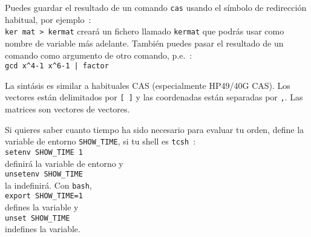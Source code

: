 \documentclass{article}
\begin{document}
Puedes guardar el resultado de un comando {\tt cas} usando el s\'imbolo de redirecci\'on habitual, por ejemplo~:\\
{\tt ker mat > kermat}
crear\'a un fichero llamado {\tt kermat} que podr\'as usar como nombre de variable m\'as adelante. Tambi\'en puedes pasar el resultado de un comando como argumento de otro comando, p.e.~:\\
\verb?gcd x^4-1 x^6-1 | factor?

La sint\'asis es similar a habituales CAS (especialmente HP49/40G CAS). 
Los vectores est\'an delimitados por {\tt [ ]} y las coordenadas est\'an separadas por {\tt ,}.
Las matrices son vectores de vectores.

Si quieres saber cuanto tiempo ha sido necesario para evaluar tu orden,
define la variable de entorno \verb|SHOW_TIME|, si tu shell es
\verb|tcsh|~:\\
\verb|setenv SHOW_TIME 1|\\
definir\'a la variable de entorno y\\
\verb|unsetenv SHOW_TIME|\\
la indefinir\'a. Con \verb|bash|,\\
\verb|export SHOW_TIME=1|\\
defines la variable y\\
\verb|unset SHOW_TIME|\\
indefines la variable.
\end{document}
